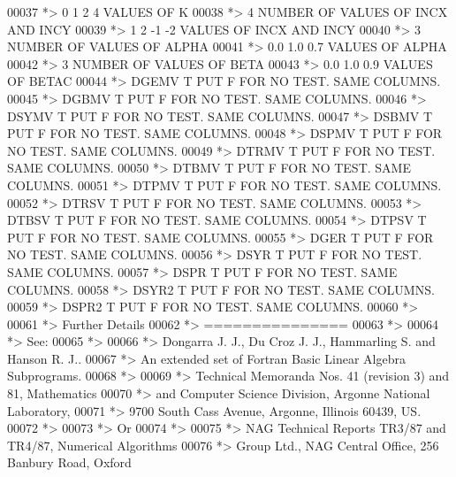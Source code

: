 \begin{DoxyCode}
00037 \textcolor{comment}{*> 0 1 2 4           VALUES OF K}
00038 \textcolor{comment}{*> 4                 NUMBER OF VALUES OF INCX AND INCY}
00039 \textcolor{comment}{*> 1 2 -1 -2         VALUES OF INCX AND INCY}
00040 \textcolor{comment}{*> 3                 NUMBER OF VALUES OF ALPHA}
00041 \textcolor{comment}{*> 0.0 1.0 0.7       VALUES OF ALPHA}
00042 \textcolor{comment}{*> 3                 NUMBER OF VALUES OF BETA}
00043 \textcolor{comment}{*> 0.0 1.0 0.9       VALUES OF BETAC}
00044 \textcolor{comment}{*> DGEMV  T PUT F FOR NO TEST. SAME COLUMNS.}
00045 \textcolor{comment}{*> DGBMV  T PUT F FOR NO TEST. SAME COLUMNS.}
00046 \textcolor{comment}{*> DSYMV  T PUT F FOR NO TEST. SAME COLUMNS.}
00047 \textcolor{comment}{*> DSBMV  T PUT F FOR NO TEST. SAME COLUMNS.}
00048 \textcolor{comment}{*> DSPMV  T PUT F FOR NO TEST. SAME COLUMNS.}
00049 \textcolor{comment}{*> DTRMV  T PUT F FOR NO TEST. SAME COLUMNS.}
00050 \textcolor{comment}{*> DTBMV  T PUT F FOR NO TEST. SAME COLUMNS.}
00051 \textcolor{comment}{*> DTPMV  T PUT F FOR NO TEST. SAME COLUMNS.}
00052 \textcolor{comment}{*> DTRSV  T PUT F FOR NO TEST. SAME COLUMNS.}
00053 \textcolor{comment}{*> DTBSV  T PUT F FOR NO TEST. SAME COLUMNS.}
00054 \textcolor{comment}{*> DTPSV  T PUT F FOR NO TEST. SAME COLUMNS.}
00055 \textcolor{comment}{*> DGER   T PUT F FOR NO TEST. SAME COLUMNS.}
00056 \textcolor{comment}{*> DSYR   T PUT F FOR NO TEST. SAME COLUMNS.}
00057 \textcolor{comment}{*> DSPR   T PUT F FOR NO TEST. SAME COLUMNS.}
00058 \textcolor{comment}{*> DSYR2  T PUT F FOR NO TEST. SAME COLUMNS.}
00059 \textcolor{comment}{*> DSPR2  T PUT F FOR NO TEST. SAME COLUMNS.}
00060 \textcolor{comment}{*>}
00061 \textcolor{comment}{*> Further Details}
00062 \textcolor{comment}{*> ===============}
00063 \textcolor{comment}{*>}
00064 \textcolor{comment}{*>    See:}
00065 \textcolor{comment}{*>}
00066 \textcolor{comment}{*>       Dongarra J. J., Du Croz J. J., Hammarling S.  and Hanson R. J..}
00067 \textcolor{comment}{*>       An  extended  set of Fortran  Basic Linear Algebra Subprograms.}
00068 \textcolor{comment}{*>}
00069 \textcolor{comment}{*>       Technical  Memoranda  Nos. 41 (revision 3) and 81,  Mathematics}
00070 \textcolor{comment}{*>       and  Computer Science  Division,  Argonne  National Laboratory,}
00071 \textcolor{comment}{*>       9700 South Cass Avenue, Argonne, Illinois 60439, US.}
00072 \textcolor{comment}{*>}
00073 \textcolor{comment}{*>       Or}
00074 \textcolor{comment}{*>}
00075 \textcolor{comment}{*>       NAG  Technical Reports TR3/87 and TR4/87,  Numerical Algorithms}
00076 \textcolor{comment}{*>       Group  Ltd.,  NAG  Central  Office,  256  Banbury  Road, Oxford}

\end{DoxyCode}
